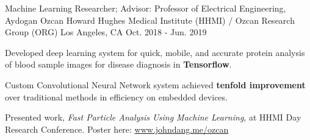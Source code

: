 \cventry
    {Machine Learning Researcher; Advisor: Professor of Electrical Engineering, Aydogan Ozcan} %
    {Howard Hughes Medical Institute (HHMI) / Ozcan Research Group (ORG)} %
    {Los Angeles, CA} %
    {Oct. 2018 - Jun. 2019} %
    {
      \begin{cvitems} %
        \item {Developed deep learning system for quick, mobile, and accurate protein analysis of blood sample images for disease diagnosis in \textbf{Tensorflow}.}
        \item {Custom Convolutional Neural Network system achieved \textbf{tenfold improvement} over traditional methods in efficiency on embedded devices.}
        \item Presented work, \textit{Fast Particle Analysis Using Machine Learning}, at HHMI Day Research Conference. Poster here: \href{https://www.johndang.me/ozcan}{www.johndang.me/ozcan}
      \end{cvitems}
    }